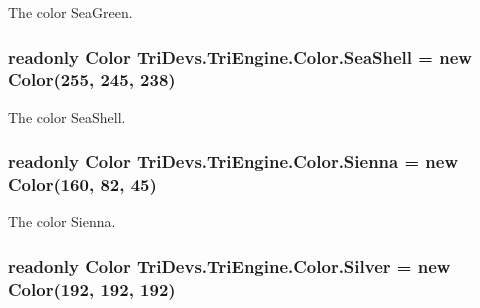 The color Sea\-Green. 

\hypertarget{struct_tri_devs_1_1_tri_engine_1_1_color_a3e2379f5d86520839adb3f76f9181e79}{
\subsubsection[{Sea\-Shell}]{\setlength{\rightskip}{0pt plus 5cm}readonly {\bf Color} Tri\-Devs.\-Tri\-Engine.\-Color.\-Sea\-Shell = new {\bf Color}(255, 245, 238)\hspace{0.3cm}{\ttfamily [static]}}}\label{struct_tri_devs_1_1_tri_engine_1_1_color_a3e2379f5d86520839adb3f76f9181e79}


The color Sea\-Shell. 

\hypertarget{struct_tri_devs_1_1_tri_engine_1_1_color_a63557c668e0c06554f99dd7282256fd9}{
\subsubsection[{Sienna}]{\setlength{\rightskip}{0pt plus 5cm}readonly {\bf Color} Tri\-Devs.\-Tri\-Engine.\-Color.\-Sienna = new {\bf Color}(160, 82, 45)\hspace{0.3cm}{\ttfamily [static]}}}\label{struct_tri_devs_1_1_tri_engine_1_1_color_a63557c668e0c06554f99dd7282256fd9}


The color Sienna. 

\hypertarget{struct_tri_devs_1_1_tri_engine_1_1_color_acce920046813f5f9fb06f9a6aba476b2}{
\subsubsection[{Silver}]{\setlength{\rightskip}{0pt plus 5cm}readonly {\bf Color} Tri\-Devs.\-Tri\-Engine.\-Color.\-Silver = new {\bf Color}(192, 192, 192)\hspace{0.3cm}{\ttfamily [static]}}}\label{struct_tri_devs_1_1_tri_engine_1_1_color_acce920046813f5f9fb06f9a6aba476b2}


